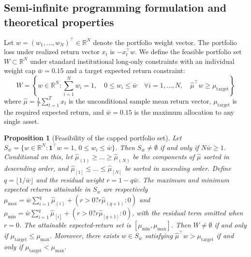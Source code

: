 \documentclass[11pt, a4paper]{article}
\newtheorem{proposition}{Proposition}
\begin{document}
\subsection{Semi-infinite programming formulation and theoretical properties}
Let $w = (w_1, \dots, w_N)^\top \in \mathbb{R}^N$ denote the portfolio weight vector. The portfolio loss under realized return vector $x_t$ is $-x_t^\top w$. We define the feasible portfolio set $W \subset \mathbb{R}^N$ under standard institutional long-only constraints with an individual weight cap $\bar{w} = 0.15$ and a target expected return constraint:
\begin{equation}
    W = \left\{ w \in \mathbb{R}^N : \sum_{i=1}^N w_i = 1, \quad 0 \le w_i \le \bar{w} \quad \forall i=1,\dots,N, \quad \hat{\mu}^\top w \ge \mu_{\text{target}} \right\}
\end{equation}
where $\hat{\mu} = \frac{1}{T} \sum_{t=1}^T x_t$ is the unconditional sample mean return vector, $\mu_{\text{target}}$ is the required expected return, and $\bar{w} = 0.15$ is the maximum allocation to any single asset.

\begin{proposition}[Feasibility of the capped portfolio set]
Let $S_{\bar w}=\{w \in \mathbb{R}^N : \mathbf{1}^\top w=1,\ 0\leq w_i\leq\bar w\}$. Then $S_{\bar w}\neq\emptyset$ if and only if $N\bar w\geq 1$. Conditional on this, let $\hat{\mu}_{(1)} \ge \dots \ge \hat{\mu}_{(N)}$ be the components of $\hat{\mu}$ sorted in descending order, and $\hat{\mu}_{[1]} \le \dots \le \hat{\mu}_{[N]}$ be sorted in ascending order. Define $q = \lfloor 1/\bar{w} \rfloor$ and the residual weight $r = 1 - q \bar{w}$. The maximum and minimum expected returns attainable in $S_{\bar w}$ are respectively $\mu_{\max} = \bar{w} \sum_{i=1}^q \hat{\mu}_{(i)} + (r > 0 ? r \hat{\mu}_{(q+1)} : 0)$ and $\mu_{\min} = \bar{w} \sum_{i=1}^q \hat{\mu}_{[i]} + (r > 0 ? r \hat{\mu}_{[q+1]} : 0)$, with the residual term omitted when $r=0$. The attainable expected-return set is $[\mu_{\min}, \mu_{\max}]$. Then $W\neq\emptyset$ if and only if $\mu_{\mathrm{target}}\leq\mu_{\max}$. Moreover, there exists $w\in S_{\bar w}$ satisfying $\hat\mu^\top w>\mu_{\mathrm{target}}$ if and only if $\mu_{\mathrm{target}}<\mu_{\max}$.
\end{proposition}
\end{document}
